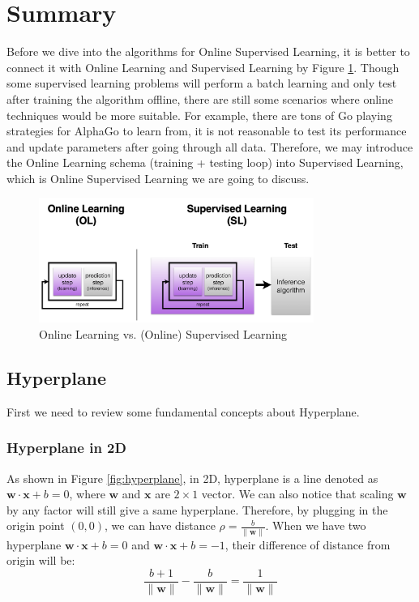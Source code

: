 \documentclass[11pt]{article}
\begin{document}
\section{Summary}
Before we dive into the algorithms for Online Supervised Learning, it is better to connect it with Online Learning and Supervised Learning by Figure \ref{fig:OLSL}. Though some supervised learning problems will perform a batch learning and only test after training the algorithm offline, there are still some scenarios where online techniques would be more suitable. For example, there are tons of Go playing strategies for AlphaGo to learn from, it is not reasonable to test its performance and update parameters after going through all data. Therefore, we may introduce the Online Learning schema (training + testing loop) into Supervised Learning, which is Online Supervised Learning we are going to discuss.

\begin{figure}[H]
\centering
\includegraphics[width=0.8\textwidth]{OLSL.png}
\caption{Online Learning vs. (Online) Supervised Learning}
\label{fig:OLSL}
\end{figure}

\subsection{Hyperplane}
First we need to review some fundamental concepts about Hyperplane.
\subsubsection{Hyperplane in 2D}
As shown in Figure \ref{fig:hyperplane}, in 2D, hyperplane is a line denoted as $\mathbf{w}\cdot\mathbf{x} + b = 0$, where $\mathbf{w}$ and $\mathbf{x}$ are $2\times1$ vector. We can also notice that scaling $\mathbf{w}$ by any factor will still give a same hyperplane. 
\normalfont
Therefore, by plugging in the origin point $(0,0)$, we can have distance $\rho=\frac{b}{\|\boldsymbol{w}\|}$. When we have two hyperplane $\mathbf{w}\cdot\mathbf{x} + b = 0$ and $\mathbf{w}\cdot\mathbf{x} + b = -1$, their difference of distance from origin will be:
\begin{equation}
\frac{b+1}{\|\boldsymbol{w}\|}-\frac{b}{\|\boldsymbol{w}\|}=\frac{1}{\|\boldsymbol{w}\|}
\end{equation}
\end{document}
